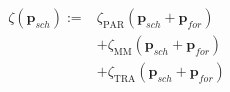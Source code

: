 \begin{equation}
\begin{split}
	\zeta(\textbf{p}_{sch}) := &\zeta_\text{PAR}(\textbf{p}_{sch}+	\textbf{p}_{for})\\
	&+ \zeta_\text{MM}(\textbf{p}_{sch}+\textbf{p}_{for})\\
	&+ \zeta_\text{TRA}(\textbf{p}_{sch}+\textbf{p}_{for})
\end{split}
\label{ch2:equ:cost-global}
\end{equation}